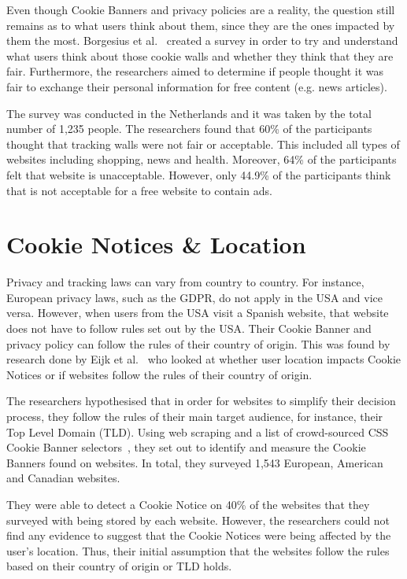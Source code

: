 \documentclass[../main.tex]{subfiles}
\begin{document}
Even though Cookie Banners and privacy policies are a reality, the question still remains as to what users think about them, since they are the ones impacted by them the most. Borgesius et al.~\cite{zuiderveen2017tracking} created a survey in order to try and understand what users think about those cookie walls and whether they think that they are fair. Furthermore, the researchers aimed to determine if people thought it was fair to exchange their personal information for free content (e.g. news articles). 

The survey was conducted in the Netherlands and it was taken by the total number of 1,235 people. The researchers found that 60\% of the participants thought that tracking walls were not fair or acceptable. This included all types of websites including shopping, news and health. Moreover, 64\% of the participants felt that  website is unacceptable. However, only 44.9\% of the participants think that is not acceptable for a free website to contain ads.

\section{Cookie Notices \& Location}
Privacy and tracking laws can vary from country to country. For instance, European privacy laws, such as the GDPR, do not apply in the USA and vice versa. However, when users from the USA visit a Spanish website, that website does not have to follow rules set out by the USA. Their Cookie Banner and privacy policy can follow the rules of their country of origin. This was found by research done by Eijk et al.~\cite{eijk2019impact} who looked at whether user location impacts Cookie Notices or if websites follow the rules of their country of origin. 

The researchers hypothesised that in order for websites to simplify their decision process, they follow the rules of their main target audience, for instance, their Top Level Domain (TLD). Using web scraping and a list of crowd-sourced CSS Cookie Banner selectors~\cite{kladnik}, they set out to identify and measure the Cookie Banners found on websites. In total, they surveyed 1,543 European, American and Canadian websites. 

They were able to detect a Cookie Notice on 40\% of the websites that they surveyed with  being stored by each website. However, the researchers could not find any evidence to suggest that the Cookie Notices were being affected by the user’s location. Thus, their initial assumption that the websites follow the rules based on their country of origin or TLD holds.
\end{document}
